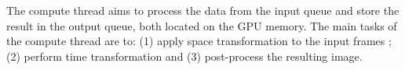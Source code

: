 The compute thread aims to process the data from the input queue and store the result in the output queue, both located on the GPU memory. The main tasks of the compute thread are to: (1) apply space transformation to the input frames ; (2) perform time transformation and (3) post-process the resulting image.